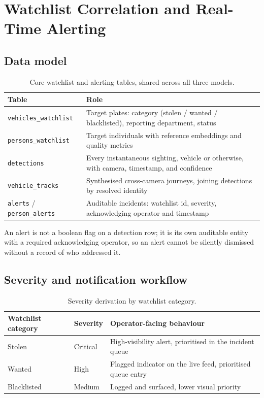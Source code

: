 \documentclass[11pt,a4paper]{article}
\begin{document}
\section{Watchlist Correlation and Real-Time Alerting}
\label{sec:alerting}

\subsection{Data model}

\begin{table}[h]
\centering
\small
\begin{tabular}{L{3.0cm}L{9.5cm}}
\toprule
\textbf{Table} & \textbf{Role} \\
\midrule
\texttt{vehicles\_watchlist} & Target plates: category (stolen / wanted / blacklisted), reporting department, status \\
\texttt{persons\_watchlist} & Target individuals with reference embeddings and quality metrics \\
\texttt{detections} & Every instantaneous sighting, vehicle or otherwise, with camera, timestamp, and confidence \\
\texttt{vehicle\_tracks} & Synthesised cross-camera journeys, joining detections by resolved identity \\
\texttt{alerts} / \texttt{person\_alerts} & Auditable incidents: watchlist id, severity, acknowledging operator and timestamp \\
\bottomrule
\end{tabular}
\caption{Core watchlist and alerting tables, shared across all three models.}
\end{table}

An alert is not a boolean flag on a detection row; it is its own
auditable entity with a required acknowledging operator, so an alert
cannot be silently dismissed without a record of who addressed it.

\subsection{Severity and notification workflow}

\begin{table}[h]
\centering
\small
\begin{tabular}{lll}
\toprule
\textbf{Watchlist category} & \textbf{Severity} & \textbf{Operator-facing behaviour} \\
\midrule
Stolen & Critical & High-visibility alert, prioritised in the incident queue \\
Wanted & High & Flagged indicator on the live feed, prioritised queue entry \\
Blacklisted & Medium & Logged and surfaced, lower visual priority \\
\bottomrule
\end{tabular}
\caption{Severity derivation by watchlist category.}
\end{table}
\end{document}
